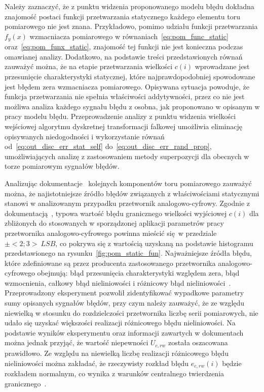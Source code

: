 Należy zaznaczyć, że z punktu widzenia proponowanego modelu błędu dokładna znajomość postaci funkcji przetwarzania statycznego każdego elementu toru pomiarowego nie jest znana. Przykładowo, pomimo udziału funkcji przetwarzania $f_{y}(x)$ wzmacniacza pomiarowego w równaniach~\eqref{eq:pom_func_static} oraz~\eqref{eq:pom_funx_static}, znajomość tej funkcji nie jest konieczna podczas omawianej analizy. Dodatkowo, na podstawie treści przedstawionych równań zauważyć można, że na etapie przetwarzania wielkości $c(i)$ wprowadzane jest przesunięcie charakterystyki statycznej, które najprawdopodobniej spowodowane jest błędem zera wzmacniacza pomiarowego. Opisywana sytuacja powoduje, że funkcja przetwarzania nie spełnia właściwości addytywności, przez co nie jest możliwa analiza każdego sygnału błędu z osobna, jak proponowano w opisanym w pracy modelu błędu. Przeprowadzenie analizy z punktu widzenia wielkości wejściowej algorytmu dyskretnej transformacji falkowej umożliwia eliminację opisywanych niedogodności i wykorzystanie równań od~\eqref{eq:out_disc_err_stat_self} do~\eqref{eq:out_disc_err_rand_prop}, umożliwiających analizę z zastosowaniem metody superpozycji dla obecnych w torze pomiarowym sygnałów błędów.

Analizując dokumentacje~\cite{microchip_manual, stm_manual, diodes_manual, stm_f411} kolejnych komponentów toru pomiarowego zauważyć można, że najistotniejsze źródło błędów związanych z właściwościami statycznymi stanowi w analizowanym przypadku przetwornik analogowo-cyfrowy. Zgodnie z dokumentacją~\cite{stm_f411}, typowa wartość błędu granicznego wielkości wyjściowej $c(i)$ dla zbliżonych do stosowanych w sporządzonej aplikacji parametrów pracy przetwornika analogowo-cyfrowego powinna mieścić się w przedziale $\pm<2; 3>~\unit{LSB}$, co pokrywa się z wartością uzyskaną na podstawie histogramu przedstawionego na rysunku~\ref{fig:pom_static_fun}. Najważniejsze źródła błędu, które zdefiniowane są przez producenta zastosowanego przetwornika analogowo-cyfrowego obejmują: błąd przesunięcia charakterystyki względem zera, błąd wzmocnienia, całkowy błąd nieliniowości i różnicowy błąd nieliniowości~\cite{stm_adc}. Przeprowadzony eksperyment pozwolił zidentyfikować wypadkowe parametry sumy opisanych sygnałów błędów, przy czym należy zauważyć, że ze względu niewielką w stosunku do rozdzielczości przetwornika liczbę serii pomiarowych, nie udało się uzyskać większości realizacji różnicowego błędu nieliniowości. Na podstawie wyników eksperymentu oraz informacji zawartych w dokumentach~\cite{stm_f411, stm_adc} można jednak przyjąć, że wartość niepewności $U_{c,rw}$ została oszacowana prawidłowo. Ze względu na niewielką liczbę realizacji różnicowego błędu nieliniowości można zakładać, że rzeczywisty rozkład błędu $e_{c,rw}(i)$ będzie rozkładem normalnym, co wynika z warunków centralnego twierdzenia granicznego~\cite{jcgm_guide}.

